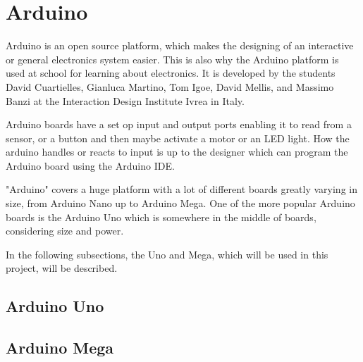 \section{Arduino}
\label{sec:arduino}
Arduino is an open source platform, which makes the designing of an interactive or general electronics system easier. This is also why the Arduino platform is used at school for learning about electronics. It is developed by the students David Cuartielles, Gianluca Martino, Tom Igoe, David Mellis, and Massimo Banzi at the Interaction Design Institute Ivrea in Italy\cite{makingofarduino}.

Arduino boards have a set op input and output ports enabling it to read from a sensor, or a button and then maybe activate a motor or an LED light. How the arduino handles or reacts to input is up to the designer which can program the Arduino board using the Arduino IDE.

"Arduino" covers a huge platform with a lot of different boards greatly varying in size, from Arduino Nano up to Arduino Mega. One of the more popular Arduino boards is the Arduino Uno which is somewhere in the middle of boards, considering size and power.

In the following subsections, the Uno and Mega, which will be used in this project, will be described.

\subsection{Arduino Uno}

\subsection{Arduino Mega} 